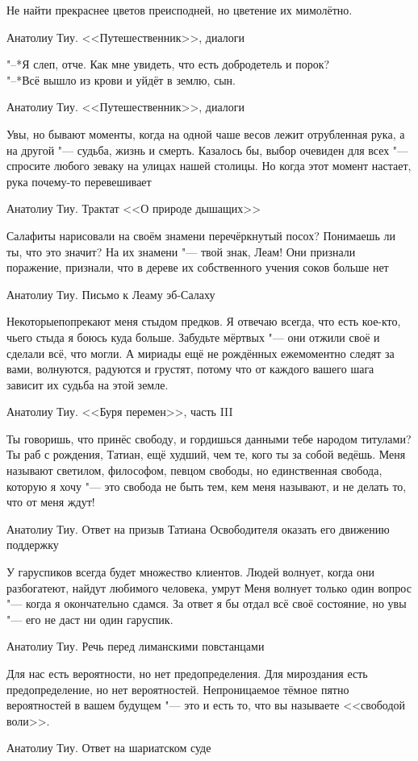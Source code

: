 \epigraph
{Не найти прекраснее цветов преисподней, но цветение их мимолётно.}
{Анатолиу Тиу.
<<Путешественник>>, диалоги}

\epigraph
{"--*Я слеп, отче.
Как мне увидеть, что есть добродетель и порок?\\
"--*Всё вышло из крови и уйдёт в землю, сын.}
{Анатолиу Тиу.
<<Путешественник>>, диалоги}

\epigraph
{\ldotst Увы, но бывают моменты, когда на одной чаше весов лежит отрубленная рука, а на другой "--- судьба, жизнь и смерть.
Казалось бы, выбор очевиден для всех "--- спросите любого зеваку на улицах нашей столицы.
Но когда этот момент настает, рука почему-то перевешивает\ldotst}
{Анатолиу Тиу.
Трактат <<О природе дышащих>>}

\epigraph
{Салафиты нарисовали на своём знамени перечёркнутый посох?
Понимаешь ли ты, что это значит?
На их знамени "--- твой знак, Леам!
Они признали поражение, признали, что в дереве их собственного учения соков больше нет\ldotst}
{Анатолиу Тиу.
Письмо к Леаму эб-Салаху}

\epigraph
{Некоторые\ldotst попрекают меня стыдом предков.
Я отвечаю всегда, что есть кое-кто, чьего стыда я боюсь куда больше.
Забудьте мёртвых "--- они отжили своё и сделали всё, что могли.
А мириады ещё не рождённых ежемоментно следят за вами, волнуются, радуются и грустят, потому что от каждого вашего шага зависит их судьба на этой земле.}
{Анатолиу Тиу.
<<Буря перемен>>, часть III}

\epigraph
{Ты говоришь, что принёс свободу, и гордишься данными тебе народом титулами?
Ты раб с рождения, Татиан, ещё худший, чем те, кого ты за собой ведёшь.
Меня называют светилом, философом, певцом свободы, но единственная свобода, которую я хочу "--- это свобода не быть тем, кем меня называют, и не делать то, что от меня ждут!}
{Анатолиу Тиу.
Ответ на призыв Татиана Освободителя оказать его движению поддержку}

\epigraph
{У гаруспиков всегда будет множество клиентов.
Людей волнует, когда они разбогатеют, найдут любимого человека, умрут\ldotst
Меня волнует только один вопрос "--- когда я окончательно сдамся.
За ответ я бы отдал всё своё состояние, но увы "--- его не даст ни один гаруспик.}
{Анатолиу Тиу.
Речь перед лиманскими повстанцами}

\epigraph
{Для нас есть вероятности, но нет предопределения.
Для мироздания есть предопределение, но нет вероятностей.
Непроницаемое тёмное пятно вероятностей в вашем будущем "--- это и есть то, что вы называете <<свободой воли>>.}
{Анатолиу Тиу.
Ответ на шариатском суде}

